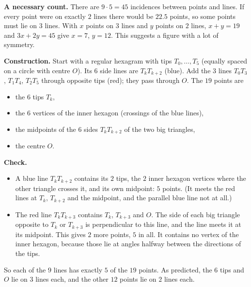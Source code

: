 \textbf{A necessary count.} There are $9\cdot5=45$ incidences between points and lines. If every point were on exactly $2$ lines there would be $22.5$ points, so some points must lie on $3$ lines. With $x$ points on $3$ lines and $y$ points on $2$ lines, $x+y=19$ and $3x+2y=45$ give $x=7$, $y=12$. This suggests a figure with a lot of symmetry.

\textbf{Construction.} Start with a regular hexagram with tips $T_0,\dots,T_5$ (equally spaced on a circle with centre $O$). Its $6$ side lines are $T_kT_{k+2}$ (blue). Add the $3$ lines $T_0T_3$, $T_1T_4$, $T_2T_5$ through opposite tips (red); they pass through $O$. The $19$ points are
\begin{itemize}
\item the $6$ tips $T_k$,
\item the $6$ vertices of the inner hexagon (crossings of the blue lines),
\item the midpoints of the $6$ sides $T_kT_{k+2}$ of the two big triangles,
\item the centre $O$.
\end{itemize}


\textbf{Check.}
\begin{itemize}
\item A blue line $T_kT_{k+2}$ contains its $2$ tips, the $2$ inner hexagon vertices where the other triangle crosses it, and its own midpoint: $5$ points. (It meets the red lines at $T_k$, $T_{k+2}$ and the midpoint, and the parallel blue line not at all.)
\item The red line $T_kT_{k+3}$ contains $T_k$, $T_{k+3}$ and $O$. The side of each big triangle opposite to $T_k$ or $T_{k+3}$ is perpendicular to this line, and the line meets it at its midpoint. This gives $2$ more points, $5$ in all. It contains no vertex of the inner hexagon, because those lie at angles halfway between the directions of the tips.
\end{itemize}
So each of the $9$ lines has exactly $5$ of the $19$ points. As predicted, the $6$ tips and $O$ lie on $3$ lines each, and the other $12$ points lie on $2$ lines each.

